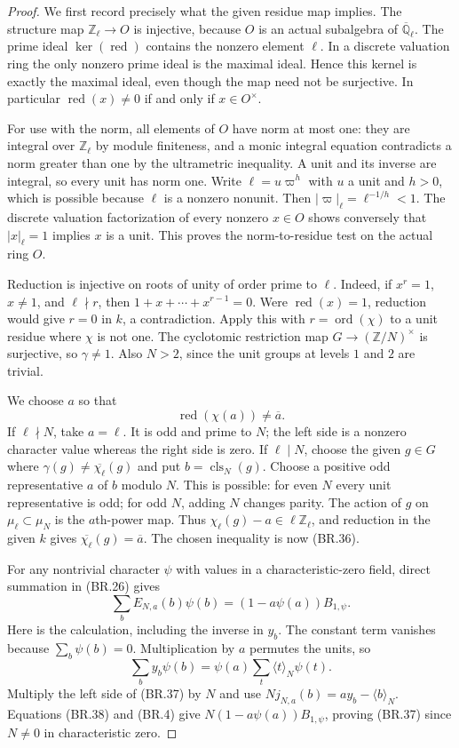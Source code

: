 \begin{proof}
We first record precisely what the given residue map implies.
The structure map $\mathbb Z_\ell\to O$ is injective, because $O$
is an actual subalgebra of $\overline{\mathbb Q}_\ell$.
The prime ideal $\ker(\operatorname{red})$ contains the nonzero
element $\ell$.  In a discrete valuation ring the only nonzero
prime ideal is the maximal ideal.  Hence this kernel is exactly
the maximal ideal, even though the map need not be surjective.
In particular $\operatorname{red}(x)\ne0$ if and only if $x\in O^\times$.

For use with the norm, all elements of $O$ have norm at most one:
they are integral over $\mathbb Z_\ell$ by module finiteness,
and a monic integral equation contradicts a norm greater than one
by the ultrametric inequality.  A unit and its inverse are integral,
so every unit has norm one.  Write
$\ell=u\varpi^h$ with $u$ a unit and $h>0$, which is possible
because $\ell$ is a nonzero nonunit.
Then $|\varpi|_\ell=\ell^{-1/h}<1$.
The discrete valuation factorization of every nonzero $x\in O$
shows conversely that $|x|_\ell=1$ implies $x$ is a unit.
This proves the norm-to-residue test on the actual ring $O$.

Reduction is injective on roots of unity of order prime to $\ell$.
Indeed, if $x^r=1$, $x\ne1$, and $\ell\nmid r$, then
$1+x+\cdots+x^{r-1}=0$.  Were $\operatorname{red}(x)=1$,
reduction would give $r=0$ in $k$, a contradiction.
Apply this with $r=\operatorname{ord}(\chi)$ to a unit residue
where $\chi$ is not one.  The cyclotomic restriction map
$G\to(\mathbb Z/N)^\times$ is surjective, so $\gamma\ne1$.
Also $N>2$, since the unit groups at levels $1$ and $2$ are trivial.

We choose $a$ so that
\[
                    \operatorname{red}(\chi(a))\ne \overline a.
                    \tag{BR.36}
\]
If $\ell\nmid N$, take $a=\ell$.
It is odd and prime to $N$; the left side is a nonzero character
value whereas the right side is zero.
If $\ell\mid N$, choose the given $g\in G$ where
$\gamma(g)\ne\overline{\chi_\ell}(g)$ and put
$b=\operatorname{cls}_N(g)$.
Choose a positive odd representative $a$ of $b$ modulo $N$.
This is possible: for even $N$ every unit representative is odd;
for odd $N$, adding $N$ changes parity.
The action of $g$ on $\mu_\ell\subset\mu_N$ is the $a$th-power
map.  Thus $\chi_\ell(g)-a\in\ell\mathbb Z_\ell$, and reduction
in the given $k$ gives
$\overline{\chi_\ell}(g)=\overline a$.
The chosen inequality is now (BR.36).

For any nontrivial character $\psi$ with values in a
characteristic-zero field, direct summation in (BR.26) gives
\[
 \sum_b E_{N,a}(b)\psi(b)
                    =(1-a\psi(a))B_{1,\psi}.
                    \tag{BR.37}
\]
Here is the calculation, including the inverse in $y_b$.
The constant term vanishes because $\sum_b\psi(b)=0$.
Multiplication by $a$ permutes the units, so
\[
 \sum_b y_b\psi(b)
      =\psi(a)\sum_t\langle t\rangle_N\psi(t).
 \tag{BR.38}
\]
Multiply the left side of (BR.37) by $N$ and use
$Nj_{N,a}(b)=a y_b-\langle b\rangle_N$.
Equations (BR.38) and (BR.4) give
$N(1-a\psi(a))B_{1,\psi}$, proving (BR.37) since $N\ne0$
in characteristic zero.


\end{proof}
